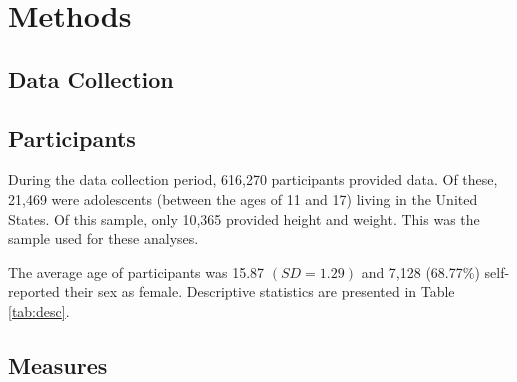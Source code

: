 \documentclass[man]{apa6}
\begin{document}
\hypertarget{methods}{%
\section{Methods}\label{methods}}

\hypertarget{data-collection}{%
\subsection{Data Collection}\label{data-collection}}

\hypertarget{participants}{%
\subsection{Participants}\label{participants}}

During the data collection period, 616,270 participants provided data. Of these, 21,469 were adolescents (between the ages of 11 and 17) living in the United States. Of this sample, only 10,365 provided height and weight. This was the sample used for these analyses.

The average age of participants was 15.87 \((SD = 1.29)\) and 7,128 (68.77\%) self-reported their sex as female. Descriptive statistics are presented in Table \ref{tab:desc}.

\hypertarget{measures}{%
\subsection{Measures}\label{measures}}
\end{document}

